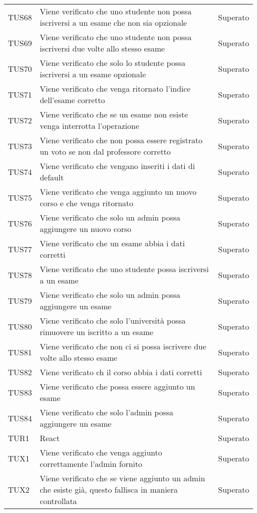 \documentclass[PianoDiQualifica.tex]{subfiles}
\begin{document}
\begin{longtable}[H]{P{2cm}P{8.5cm}P{3cm}}
	TUS68 & Viene verificato che uno studente non possa iscriversi a un esame che non sia opzionale & Superato \\
	TUS69 & Viene verificato che uno studente non possa iscriversi due volte allo stesso esame & Superato \\
	TUS70 & Viene verificato che solo lo studente possa iscriversi a un esame opzionale & Superato \\
	TUS71 & Viene verificato che venga ritornato l'indice dell'esame corretto & Superato \\
	TUS72 & Viene verificato che se un esame non esiste venga interrotta l'operazione & Superato \\
	TUS73 & Viene verificato che non possa essere registrato un voto se non dal professore corretto & Superato \\
	TUS74 & Viene verificato che vengano inseriti i dati di default & Superato \\
	TUS75 & Viene verificato che venga aggiunto un nuovo corso e che venga ritornato & Superato \\
	TUS76 & Viene verificato che solo un admin possa aggiungere un nuovo corso & Superato \\
	TUS77 & Viene verificato che un esame abbia i dati corretti & Superato \\
	TUS78 & Viene verificato che uno studente possa iscriversi a un esame & Superato \\
	TUS79 & Viene verificato che solo un admin possa aggiungere un esame & Superato \\
	TUS80 & Viene verificato che solo l'università possa rimuovere un iscritto a un esame & Superato \\
	TUS81 & Viene verificato che non ci si possa iscrivere due volte allo stesso esame & Superato \\
	TUS82 & Viene verificato ch il corso abbia i dati corretti & Superato \\
	TUS83 & Viene verificato che possa essere aggiunto un esame & Superato \\
	TUS84 & Viene verificato che solo l'admin possa aggiungere un esame & Superato \\
	\hhline{===}
	TUR1 & React & Superato \\ 
	\hhline{===}
	TUX1 & Viene verificato che venga aggiunto correttamente l'admin fornito & Superato \\ 
	TUX2 & Viene verificato che se viene aggiunto un admin che esiste già, questo fallisca in maniera controllata & Superato \\

\end{longtable}
\end{document}
